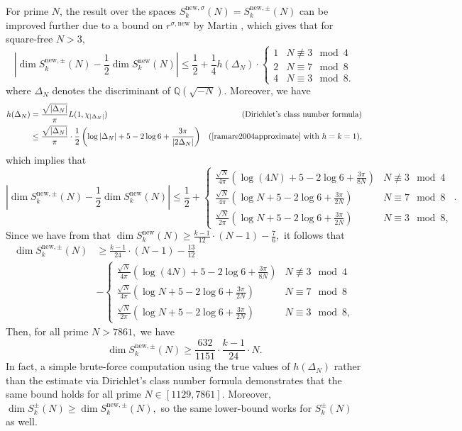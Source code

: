 \documentclass[11pt,letterpaper,reqno]{amsart}
\theoremstyle{definition}
\numberwithin{equation}{section}
\numberwithin{figure}{section}
\numberwithin{table}{section}
\newcommand{\nw}{\mathrm{new}}
\begin{document}
For prime $N$, the result over the spaces $S_k^{\nw, \sigma}(N) = S_k^{\nw, \pm}(N)$ can be improved further due to a bound on $r^{\sigma, \nw}$ by Martin \cite[Theorem 2.2]{martin2018refined}, which gives that for square-free $N > 3,$
$$\left| \dim S_k^{\nw, \pm}(N) - \frac{1}{2} \dim S_k^\nw(N) \right| \leq \frac{1}{2} + \frac{1}{4} h(\Delta_N) \cdot \begin{cases}
    1 & N \not\equiv  3 \mod 4\\
    2 & N \equiv 7 \mod 8\\
    4 & N \equiv 3 \mod 8.
\end{cases}$$
where $\Delta_N$ denotes the discriminant of $\mathbb{Q} (\sqrt{-N} )$. Moreover, we have
\begin{align*}
    h(\Delta_N)  &= \frac{\sqrt{\left| \Delta_N \right|}}{\pi} L(1, \chi_{\left| \Delta_N \right|}) & \text{(Dirichlet's class number formula)}\\
    &\leq \frac{\sqrt{\left| \Delta_N \right|}}{\pi} \cdot \frac{1}{2}\left( \log \left| \Delta_N \right| + 5 - 2\log 6 + \frac{3\pi}{\left| 2\Delta_N \right|} \right) & \text{(\cite[Corollary 1]{ramare2004approximate} with $h = k = 1$)},
\end{align*}
which implies that
$$\left| \dim S_k^{\nw, \pm}(N) - \frac{1}{2} \dim S_k^\nw(N) \right| \leq \frac{1}{2} + \begin{cases}
    \frac{\sqrt{N}}{4\pi} \left( \log (4N) + 5 - 2\log 6 + \frac{3\pi}{8 N} \right) & N \not\equiv 3 \mod 4\\
    \frac{\sqrt{N}}{4\pi} \left( \log N + 5 - 2\log 6 + \frac{3\pi}{2 N} \right) & N \equiv 7 \mod 8\\
    \frac{\sqrt{N}}{2\pi}\left( \log N + 5 - 2\log 6 + \frac{3\pi}{2 N} \right) & N \equiv 3 \mod 8,
\end{cases}.$$
Since we have from \cite[Theorem 1]{martin2005dimensions} that $\dim S_k^\nw(N) \geq \frac{k - 1}{12} \cdot (N - 1) - \frac{7}{6},$ it follows that
\begin{align}
    \dim S_k^{\nw, \pm}(N) &\geq \frac{k - 1}{24} \cdot (N - 1) - \frac{13}{12} \\
    &- \begin{cases}
    \frac{\sqrt{N}}{4\pi} \left( \log (4N) + 5 - 2\log 6 + \frac{3\pi}{8 N} \right) & N \not\equiv 3 \mod 4\\
    \frac{\sqrt{N}}{4\pi} \left( \log N + 5 - 2\log 6 + \frac{3\pi}{2 N} \right) & N \equiv 7 \mod 8\\
    \frac{\sqrt{N}}{2\pi}\left( \log N + 5 - 2\log 6 + \frac{3\pi}{2 N} \right) & N \equiv 3 \mod 8, \end{cases} \label{eqn:dimension-lower-bound-for-prime-level}
\end{align}
Then, for all prime $N > 7861,$ we have
$$\dim S_k^{\nw, \pm}(N) \geq \frac{632}{1151} \cdot \frac{k - 1}{24} \cdot N.$$
In fact, a simple brute-force computation using the true values of $h(\Delta_N)$ rather than the estimate via Dirichlet's class number formula demonstrates that the same bound holds for all prime $N \in [1129, 7861]$. Moreover, $\dim S_k^\pm(N) \geq \dim S_k^{\nw, \pm}(N),$ so the same lower-bound works for $S_k^{\pm}(N)$ as well.
\end{document}
